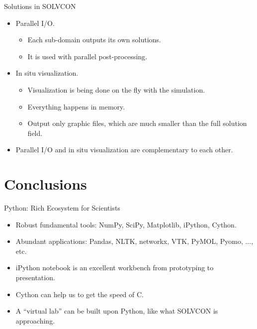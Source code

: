 \documentclass[dvips,xcolor=pst,14pt]{beamer}
\begin{document}
\begin{frame}{
%
Solutions in SOLVCON
%
}
\begin{itemize}
  \item Parallel I/O.
  \begin{itemize}
    \item Each sub-domain outputs its own solutions.
    \item It is used with \alert{parallel post-processing}.
  \end{itemize}
  \item In situ visualization.
  \begin{itemize}
    \item Visualization is being done on the fly with the simulation.
    \item Everything happens in memory.
    \item Output only graphic files, which are much smaller than the full
    solution field.
  \end{itemize}
  \item Parallel I/O and in situ visualization are complementary to each other.
\end{itemize}
\end{frame}

\section*{
Conclusions
}

\begin{frame}{
%
Python: Rich Ecosystem for Scientists
%
}
\begin{itemize}
  \item Robust fundamental tools: NumPy, SciPy, Matplotlib, iPython, Cython.
  \item Abundant applications: Pandas, NLTK, networkx, VTK, PyMOL, Pyomo, ...,
  etc.
  \item iPython notebook is an excellent workbench from prototyping to
  presentation.
  \item Cython can help us to get the speed of C.
  \item A ``virtual lab'' can be built upon Python, like what SOLVCON is
  approaching.
\end{itemize}
\end{frame}
\end{document}
